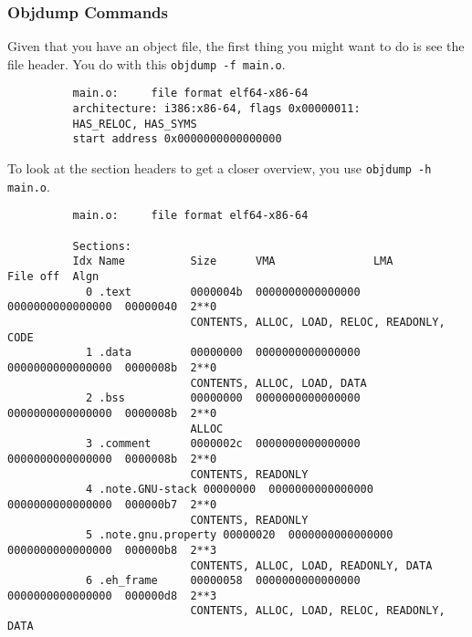       \begin{definition}[Mach-O]
        
      \end{definition}

    \subsubsection{Objdump Commands}

      \begin{theorem}
        Given that you have an object file, the first thing you might want to do is see the file header. You do with this \texttt{objdump -f main.o}. 
        \begin{lstlisting}
          main.o:     file format elf64-x86-64
          architecture: i386:x86-64, flags 0x00000011:
          HAS_RELOC, HAS_SYMS
          start address 0x0000000000000000
        \end{lstlisting}
      \end{theorem}

      \begin{theorem}
        To look at the section headers to get a closer overview, you use \texttt{objdump -h main.o}. 
        \begin{lstlisting}
          main.o:     file format elf64-x86-64

          Sections:
          Idx Name          Size      VMA               LMA               File off  Algn
            0 .text         0000004b  0000000000000000  0000000000000000  00000040  2**0
                            CONTENTS, ALLOC, LOAD, RELOC, READONLY, CODE
            1 .data         00000000  0000000000000000  0000000000000000  0000008b  2**0
                            CONTENTS, ALLOC, LOAD, DATA
            2 .bss          00000000  0000000000000000  0000000000000000  0000008b  2**0
                            ALLOC
            3 .comment      0000002c  0000000000000000  0000000000000000  0000008b  2**0
                            CONTENTS, READONLY
            4 .note.GNU-stack 00000000  0000000000000000  0000000000000000  000000b7  2**0
                            CONTENTS, READONLY
            5 .note.gnu.property 00000020  0000000000000000  0000000000000000  000000b8  2**3
                            CONTENTS, ALLOC, LOAD, READONLY, DATA
            6 .eh_frame     00000058  0000000000000000  0000000000000000  000000d8  2**3
                            CONTENTS, ALLOC, LOAD, RELOC, READONLY, DATA
        \end{lstlisting}
      \end{theorem}

